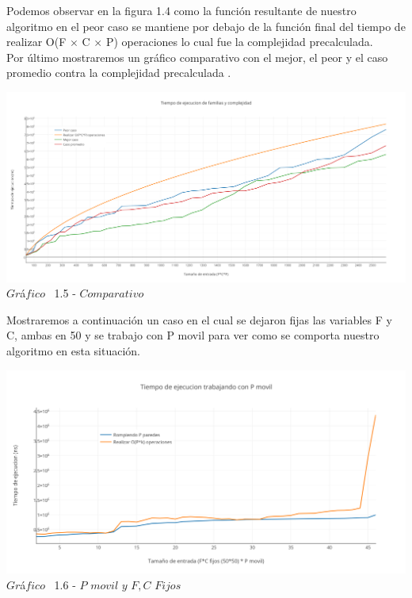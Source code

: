 Podemos observar en la figura 1.4 como la funci\'on resultante de nuestro algoritmo en el peor caso se mantiene por debajo de la funci\'on final del tiempo de realizar O(F $\times$ C $\times$ P) operaciones lo cual fue la complejidad precalculada.\\

Por \'ultimo mostraremos un gr\'afico comparativo con el mejor, el peor y el caso promedio contra la complejidad precalculada .\\

  
  \vspace*{0.3cm} \vspace*{0.3cm}
  \begin{center}
\includegraphics[scale=0.4]{./EJ1/comparativo1.png}
{$Gr$\'a$fico$ \ 1.5 - $Comparativo$}
  \end{center}
  \vspace*{0.3cm}

Mostraremos a continuaci\'on un caso en el cual se dejaron fijas las variables F y C, ambas en 50 y se trabajo con P movil para ver como se comporta nuestro algoritmo en esta situaci\'on.

\vspace*{0.3cm} \vspace*{0.3cm}
  \begin{center}
\includegraphics[scale=0.4]{./EJ1/pMovil.png}
{$Gr$\'a$fico$ \ 1.6 - $P$ $movil$ $y$ $F,C$ $Fijos$}
  \end{center}
  \vspace*{0.3cm}

